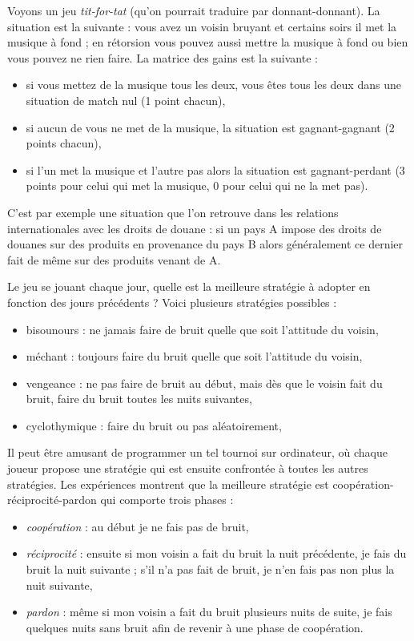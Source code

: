 \documentclass[11pt,class=report,crop=false]{standalone}
\begin{document}
\medskip

Voyons un jeu \og{}\emph{tit-for-tat}\fg{} (qu'on pourrait traduire par \og{}donnant-donnant\fg{}). 
La situation est la suivante : vous avez un voisin bruyant et certains soirs il met la musique à fond ; en rétorsion vous pouvez aussi mettre la musique à fond ou bien vous pouvez  ne rien faire. La matrice des gains est la suivante :




\begin{itemize}
	\item si vous mettez de la musique tous les deux, vous êtes tous les deux dans une situation de match nul (1 point chacun),
	\item si aucun de vous ne met de la musique, la situation est gagnant-gagnant (2 points chacun),
	\item si l'un met la musique et l'autre pas alors la situation est gagnant-perdant (3 points pour celui qui met la musique, 0 pour celui qui ne la met pas).
\end{itemize}

C'est par exemple une situation que l'on retrouve dans les relations internationales avec les droits de douane : si un pays A impose des droits de douanes sur des produits en provenance du pays B alors généralement ce dernier fait de même sur des produits venant de A.


Le jeu se jouant chaque jour, quelle est la meilleure stratégie à adopter en fonction des jours précédents ?
Voici plusieurs stratégies possibles :
\begin{itemize}
	\item bisounours : ne jamais faire de bruit quelle que soit l'attitude du voisin,
	\item méchant : toujours faire du bruit quelle que soit l'attitude du voisin,
	\item vengeance : ne pas faire de bruit au début, mais dès que le voisin fait du bruit, faire du bruit toutes les nuits suivantes,
	\item cyclothymique : faire du bruit ou pas aléatoirement,
\end{itemize}

Il peut être amusant de programmer un tel tournoi sur ordinateur, où chaque joueur propose une stratégie qui est ensuite confrontée à toutes les autres stratégies.
Les expériences montrent que la meilleure stratégie est \og{}coopération-réciprocité-pardon\fg{} qui comporte trois phases :
\begin{itemize}
	\item \emph{coopération} : au début je ne fais pas de bruit,
	\item \emph{réciprocité} : ensuite si mon voisin a fait du bruit la nuit précédente, je fais du bruit la nuit suivante ; s'il n'a pas fait de bruit, je n'en fais pas non plus la nuit suivante,
	\item \emph{pardon} : même si mon voisin a fait du bruit plusieurs nuits de suite, je fais quelques nuits sans bruit afin de revenir à une phase de coopération.
\end{itemize}	
\end{document}
